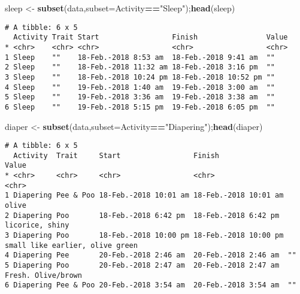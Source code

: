 \documentclass[10,portrait]{article}
\newenvironment{Shaded}{\begin{snugshade}}{\end{snugshade}}
\newcommand{\KeywordTok}[1]{\textcolor[rgb]{0.13,0.29,0.53}{\textbf{#1}}}
\newcommand{\DataTypeTok}[1]{\textcolor[rgb]{0.13,0.29,0.53}{#1}}
\newcommand{\StringTok}[1]{\textcolor[rgb]{0.31,0.60,0.02}{#1}}
\newcommand{\OperatorTok}[1]{\textcolor[rgb]{0.81,0.36,0.00}{\textbf{#1}}}
\newcommand{\NormalTok}[1]{#1}
\begin{document}
\begin{Shaded}
\begin{Highlighting}[]
\NormalTok{sleep <-}\StringTok{ }\KeywordTok{subset}\NormalTok{(data,}\DataTypeTok{subset=}\NormalTok{Activity}\OperatorTok{==}\StringTok{"Sleep"}\NormalTok{);}\KeywordTok{head}\NormalTok{(sleep)}
\end{Highlighting}
\end{Shaded}

\begin{verbatim}
# A tibble: 6 x 5
  Activity Trait Start                 Finish                Value
* <chr>    <chr> <chr>                 <chr>                 <chr>
1 Sleep    ""    18-Feb.-2018 8:53 am  18-Feb.-2018 9:41 am  ""   
2 Sleep    ""    18-Feb.-2018 11:32 am 18-Feb.-2018 3:16 pm  ""   
3 Sleep    ""    18-Feb.-2018 10:24 pm 18-Feb.-2018 10:52 pm ""   
4 Sleep    ""    19-Feb.-2018 1:40 am  19-Feb.-2018 3:00 am  ""   
5 Sleep    ""    19-Feb.-2018 3:36 am  19-Feb.-2018 3:38 am  ""   
6 Sleep    ""    19-Feb.-2018 5:15 pm  19-Feb.-2018 6:05 pm  ""   
\end{verbatim}

\begin{Shaded}
\begin{Highlighting}[]
\NormalTok{diaper <-}\StringTok{ }\KeywordTok{subset}\NormalTok{(data,}\DataTypeTok{subset=}\NormalTok{Activity}\OperatorTok{==}\StringTok{"Diapering"}\NormalTok{);}\KeywordTok{head}\NormalTok{(diaper)}
\end{Highlighting}
\end{Shaded}

\begin{verbatim}
# A tibble: 6 x 5
  Activity  Trait     Start                 Finish                Value                          
* <chr>     <chr>     <chr>                 <chr>                 <chr>                          
1 Diapering Pee & Poo 18-Feb.-2018 10:01 am 18-Feb.-2018 10:01 am olive                          
2 Diapering Poo       18-Feb.-2018 6:42 pm  18-Feb.-2018 6:42 pm  licorice, shiny                
3 Diapering Poo       18-Feb.-2018 10:00 pm 18-Feb.-2018 10:00 pm small like earlier, olive green
4 Diapering Pee       20-Feb.-2018 2:46 am  20-Feb.-2018 2:46 am  ""                             
5 Diapering Poo       20-Feb.-2018 2:47 am  20-Feb.-2018 2:47 am  Fresh. Olive/brown             
6 Diapering Pee & Poo 20-Feb.-2018 3:54 am  20-Feb.-2018 3:54 am  ""                             
\end{verbatim}
\end{document}
